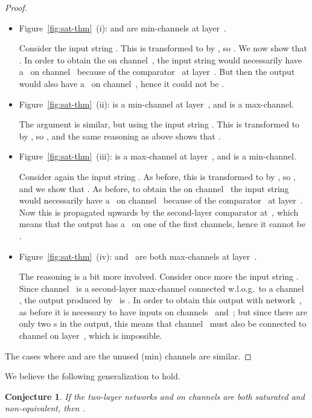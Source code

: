 \documentclass[10pt]{IEEEtran}
\newtheorem{conjecture}{Conjecture}
\begin{document}
{{\begin{proof}
  \begin{itemize}
  \item Figure~\ref{fig:sat-thm}~(i):  and  are min-channels at layer~.

    Consider the input string .  This is transformed to
     by , so .  We now show that
    .  In order to obtain the  on channel~, the
    input string would necessarily have a~ on channel~ because of the
    comparator~ at layer~.  But then the output would also have
    a~ on channel~, hence it could not be .

  \item Figure~\ref{fig:sat-thm}~(ii):  is a min-channel at layer~, and  is a max-channel.

    The argument is similar, but using the
    input string .  This is transformed to  by , so
    , and the same reasoning as above shows that
    .

  \item Figure~\ref{fig:sat-thm}~(iii):  is a max-channel at layer~, and  is a min-channel.

    Consider again the input string .  As before, this is
    transformed to  by , so , and we
    show that .  As before, to obtain the  on
    channel~ the input string would necessarily have a~ on channel~ because
    of the comparator~ at layer~.  Now this  is propagated upwards
    by the second-layer comparator at~, which means that the output has
    a~ on one of the first  channels, hence it cannot be .

  \item Figure~\ref{fig:sat-thm}~(iv):  and~ are both max-channels at layer~.

    The reasoning is a bit more involved.
    Consider once more the input string .  Since channel~ is a
    second-layer max-channel connected w.l.o.g.~to a channel , the output produced by~ is
    . In
    order to obtain this output with network~, as before it is necessary to
    have inputs  on channels~ and~; but since there are only two s in
    the output, this means that channel~ must also be connected to channel 
    on layer~, which is impossible.
  \end{itemize}

\noindent  The cases where  and  are the unused (min) channels are similar.
\end{proof}


We believe the following generalization to hold.

\begin{conjecture}\label{conjecture}
  If the two-layer networks  and  on  channels are both saturated and
  non-equivalent, then .
\end{conjecture}

}}
\end{document}
